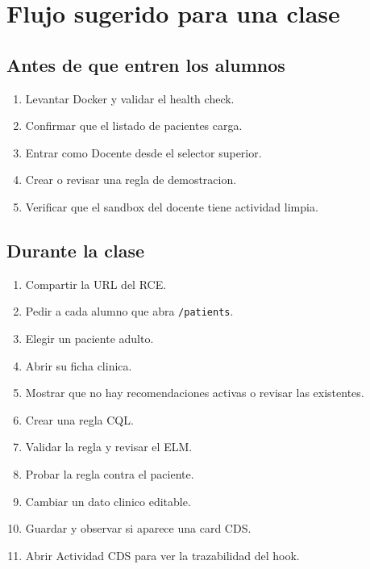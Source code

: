 \section{Flujo sugerido para una clase}

\subsection{Antes de que entren los alumnos}

\begin{enumerate}
  \item Levantar Docker y validar el health check.
  \item Confirmar que el listado de pacientes carga.
  \item Entrar como Docente desde el selector superior.
  \item Crear o revisar una regla de demostracion.
  \item Verificar que el sandbox del docente tiene actividad limpia.
\end{enumerate}

\subsection{Durante la clase}

\begin{enumerate}
  \item Compartir la URL del RCE.
  \item Pedir a cada alumno que abra \texttt{/patients}.
  \item Elegir un paciente adulto.
  \item Abrir su ficha clinica.
  \item Mostrar que no hay recomendaciones activas o revisar las existentes.
  \item Crear una regla CQL.
  \item Validar la regla y revisar el ELM.
  \item Probar la regla contra el paciente.
  \item Cambiar un dato clinico editable.
  \item Guardar y observar si aparece una card CDS.
  \item Abrir Actividad CDS para ver la trazabilidad del hook.
\end{enumerate}


